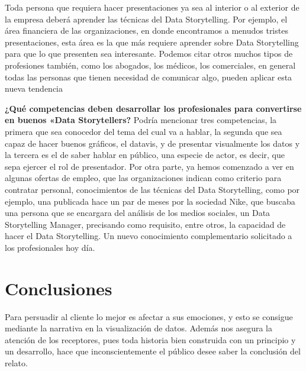 \documentclass[11pt]{article}
\begin{document}
Toda persona que requiera hacer presentaciones ya sea al interior o al exterior de la empresa deberá aprender las técnicas del Data Storytelling. Por ejemplo, el área financiera de las organizaciones, en donde encontramos a menudos tristes presentaciones, esta área es la que más requiere aprender sobre Data Storytelling para que lo que presenten sea interesante. Podemos citar otros muchos tipos de profesiones también, como los abogados, los médicos, los comerciales, en general todas las personas que tienen necesidad de comunicar algo, pueden aplicar esta nueva tendencia


{\bf ¿Qué competencias deben desarrollar los profesionales para convertirse en buenos «Data Storytellers? }
Podría mencionar tres competencias, la primera que sea conocedor del tema del cual va a hablar, la segunda que sea capaz de hacer buenos gráficos, el datavis, y de presentar visualmente los datos y la tercera es el de saber hablar en público, una especie de actor, es decir, que sepa ejercer el rol de presentador. Por otra parte, ya hemos comenzado a ver en algunas ofertas de empleo, que las organizaciones indican como criterio para contratar personal, conocimientos de las técnicas del Data Storytelling, como por ejemplo, una publicada hace un par de meses por la sociedad Nike, que buscaba una persona que se encargara del análisis de los medios sociales, un Data Storytelling Manager, precisando como requisito, entre otros, la capacidad de hacer el Data Storytelling. Un nuevo conocimiento complementario solicitado a los profesionales hoy día. 




\section*{Conclusiones}

Para persuadir al cliente lo mejor es afectar a sus emociones, y esto se consigue mediante la narrativa en la visualización de datos. Además nos asegura la atención de los receptores, pues toda historia bien construida con un principio y un desarrollo, hace que inconscientemente el público desee saber la conclusión del relato.

%
%
\end{document}
